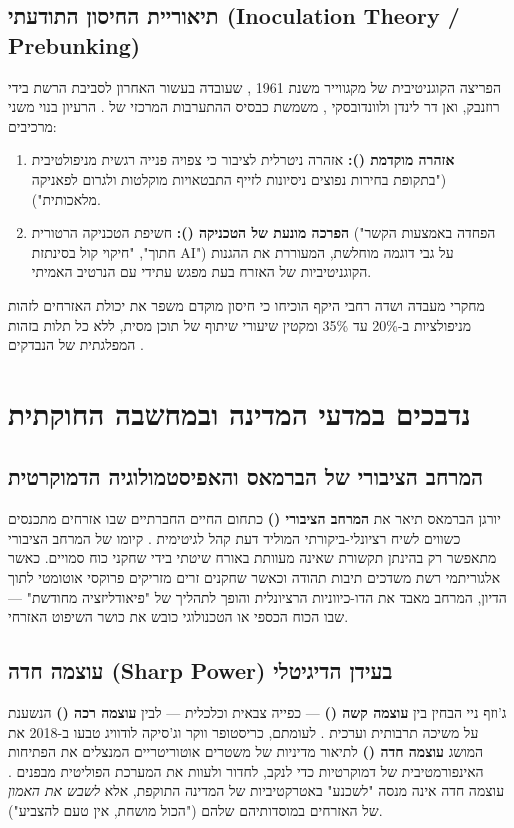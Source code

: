 \subsection{תיאוריית החיסון התודעתי (Inoculation Theory / Prebunking)}
הפריצה הקוגניטיבית של מקגווייר משנת 1961 \cite{mcguire1961}, שעובדה בעשור האחרון לסביבת הרשת בידי רוזנבק, ואן דר לינדן ולוונדובסקי \cite{roozenbeek2022}, משמשת כבסיס ההתערבות המרכזי של . הרעיון בנוי משני מרכיבים:
\begin{enumerate}
    \item \textbf{אזהרה מוקדמת ():} אזהרה ניטרלית לציבור כי צפויה פנייה רגשית מניפולטיבית ("בתקופת בחירות נפוצים ניסיונות לזייף התבטאויות מוקלטות ולגרום לפאניקה מלאכותית").
    \item \textbf{הפרכה מונעת של הטכניקה ():} חשיפת הטכניקה הרטורית ("הפחדה באמצעות הקשר חתוך", "חיקוי קול בסינתזת AI") על גבי דוגמה מוחלשת, המעוררת את ההגנות הקוגניטיביות של האזרח בעת מפגש עתידי עם הנרטיב האמיתי.
\end{enumerate}

מחקרי מעבדה ושדה רחבי היקף הוכיחו כי חיסון מוקדם משפר את יכולת האזרחים לזהות מניפולציות ב-20\% עד 35\% ומקטין שיעורי שיתוף של תוכן מסית, ללא כל תלות בזהות המפלגתית של הנבדקים \cite{roozenbeek2022}.

\section{נדבכים במדעי המדינה ובמחשבה החוקתית}

\subsection{המרחב הציבורי של הברמאס והאפיסטמולוגיה הדמוקרטית}
יורגן הברמאס תיאר את \textbf{המרחב הציבורי ()} כתחום החיים החברתיים שבו אזרחים מתכנסים כשווים לשיח רציונלי-ביקורתי המוליד דעת קהל לגיטימית \cite{habermas1989}. קיומו של המרחב הציבורי מתאפשר רק בהינתן תקשורת שאינה מעוותת באורח שיטתי בידי שחקני כוח סמויים. כאשר אלגוריתמי רשת משדכים תיבות תהודה וכאשר שחקנים זרים מזריקים פרוקסי אוטומטי לתוך הדיון, המרחב מאבד את הדו-כיווניות הרציונלית והופך לתהליך של "פיאודליזציה מחודשת" — שבו הכוח הכספי או הטכנולוגי כובש את כושר השיפוט האזרחי.

\subsection{עוצמה חדה (Sharp Power) בעידן הדיגיטלי}
ג'וזף ניי הבחין בין \textbf{עוצמה קשה ()} — כפייה צבאית וכלכלית — לבין \textbf{עוצמה רכה ()} הנשענת על משיכה תרבותית וערכית \cite{nye2004}. לעומתם, כריסטופר ווקר וג'סיקה לודוויג טבעו ב-2018 את המושג \textbf{עוצמה חדה ()} לתיאור מדיניות של משטרים אוטוריטריים המנצלים את הפתיחות האינפורמטיבית של דמוקרטיות כדי לנקב, לחדור ולעוות את המערכת הפוליטית מבפנים \cite{walker2018}. עוצמה חדה אינה מנסה "לשכנע" באטרקטיביות של המדינה התוקפת, אלא \emph{לשבש את האמון} של האזרחים במוסדותיהם שלהם ("הכול מושחת, אין טעם להצביע").

